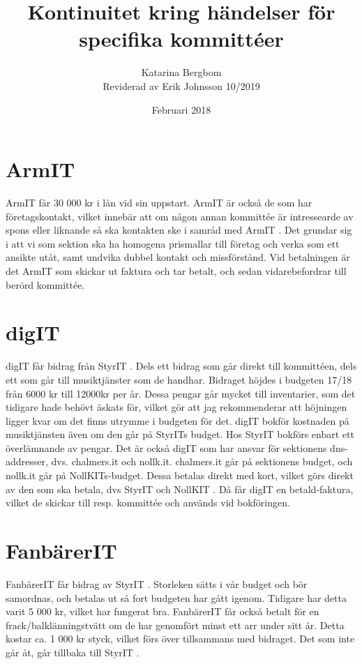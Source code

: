 \documentclass{article}
\title{Kontinuitet kring händelser för specifika kommittéer}
\author{Katarina Bergbom \\
Reviderad av Erik Johnsson 10/2019}
\date{Februari 2018}
\newcommand{\nollkit}{NollKIT }
\newcommand{\fanbarerit}{FanbärerIT }
\newcommand{\digit}{digIT }
\newcommand{\armit}{ArmIT }
\newcommand{\styrit}{StyrIT }
\begin{document}
\maketitle

\tableofcontents

\section{\armit}
ArmIT får 30 000 kr i lån vid sin uppstart. \armit är också de som har företagskontakt, vilket innebär att om någon annan kommittée är intressearde av spons eller liknande så ska kontakten ske i samråd med \armit. Det grundar sig i att vi som sektion ska ha homogena prismallar till företag och verka som ett ansikte utåt, samt undvika dubbel kontakt och missförstånd. Vid betalningen är det \armit som skickar ut faktura och tar betalt, och sedan vidarebefordrar till berörd kommittée. 

\section{\digit}
\digit får bidrag från \styrit. Dels ett bidrag som går direkt till kommittéen, dels ett som går till musiktjänster som de handhar. Bidraget höjdes i budgeten 17/18 från 6000 kr till 12000kr per år. Dessa pengar går mycket till inventarier, som det tidigare hade behövt äskats för, vilket gör att jag rekommenderar att höjningen ligger kvar om det finns utrymme i budgeten för det. \digit bokför kostnaden på musiktjänsten även om den går på StyrITs budget. Hos \styrit bokförs enbart ett överlämnande av pengar. Det är också \digit som har ansvar för sektionens dns-addresser, dvs. chalmers.it och nollk.it. chalmers.it går på sektionens budget, och nollk.it går på NollKITs-budget. Dessa betalas direkt med kort, vilket görs direkt av den som ska betala, dvs \styrit och \nollkit. Då får \digit en betald-faktura, vilket de skickar till resp. kommittée och används vid bokföringen.

\section{\fanbarerit}
\fanbarerit får bidrag av \styrit. Storleken sätts i vår budget och bör samordnas, och betalas ut så fort budgeten har gått igenom. Tidigare har detta varit 5 000 kr, vilket har fungerat bra. \fanbarerit får också betalt för en frack/balklänningstvätt om de har genomfört minst ett arr under sitt år. Detta kostar ca. 1 000 kr styck, vilket förs över tillsammans med bidraget. Det som inte går åt, går tillbaka till \styrit. 
\end{document}
